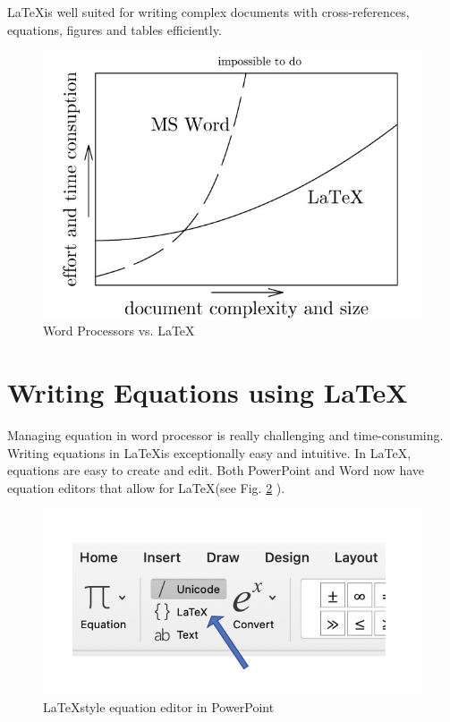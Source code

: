 \documentclass[a4paper, 12pt, one column]{article}
\begin{document}
\vspace{0.3cm}

 {
        {
        \begin{minipage}{0.9\textwidth}
            \centering
           \LaTeX \space is well suited for writing complex documents with cross-references, equations, figures and tables efficiently. 
        \end{minipage}
        }
    }

\begin{figure}[!httb]
    \centering
    \includegraphics[width=0.6\linewidth]{wordvslatex.jpg}
    \caption{Word Processors vs. \LaTeX}
    \label{wordvslatex}
    \end{figure}




\section{Writing Equations using \LaTeX}

    Managing equation in word processor is really challenging and time-consuming. Writing equations in \LaTeX \space is exceptionally easy and intuitive.  In \LaTeX , equations are easy to create and edit. Both PowerPoint and Word now have equation editors that allow for \LaTeX \space (see Fig. \ref{eqWord} ). 

    \begin{figure}[!httb]
        \centering
        \includegraphics[width=0.6\linewidth]{eqWord.png}
        \caption{ \LaTeX \space style equation editor in PowerPoint}
        \label{eqWord}
        \end{figure}
\end{document}

